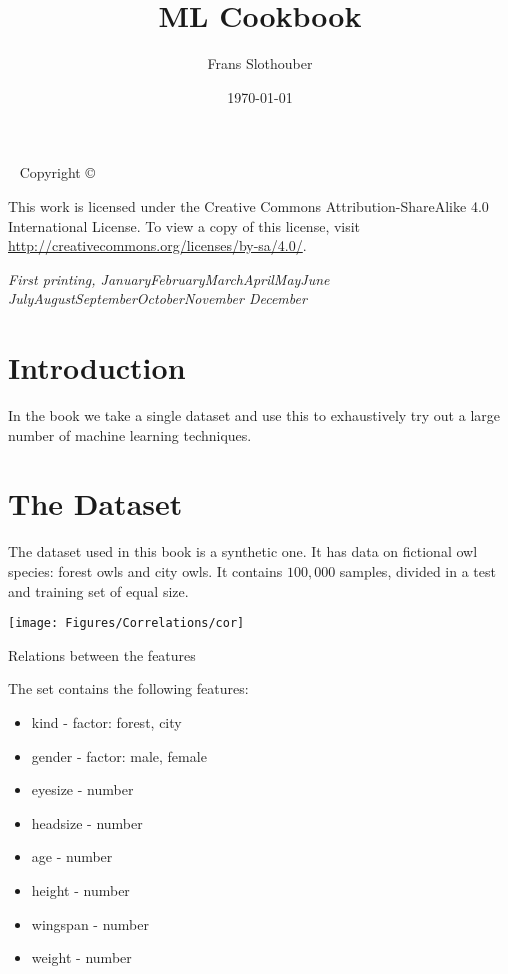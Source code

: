 \documentclass[11pt,a4paper,oldtoc,final]{tufte-book}
\title{ML Cookbook}
\author{Frans Slothouber}
\date{\today}
\newcommand{\blankpage}{\newpage\hbox{}\thispagestyle{empty}\newpage}
\newcommand{\monthyear}{%
  \ifcase\month\or January\or February\or March\or April\or May\or June\or
  July\or August\or September\or October\or November\or
  December\fi\space\number\year
}
\begin{document}
\frontmatter
\blankpage

\maketitle

\newpage
\begin{fullwidth}
~\vfill
\thispagestyle{empty}
\setlength{\parindent}{0pt}
\setlength{\parskip}{\baselineskip}
Copyright \copyright\ \the\year\ \thanklessauthor

\par{}


\par This work is licensed under the Creative Commons Attribution-ShareAlike
4.0 International License. To view a copy of this license, visit
\url{http://creativecommons.org/licenses/by-sa/4.0/}. 

\par\textit{First printing, \monthyear}
\end{fullwidth}



\chapter*{Introduction}

In the book we take a single dataset and use this to 
exhaustively try out a large number of machine learning techniques.

\mainmatter

\chapter{The Dataset}

The dataset used in this book is a synthetic one.
It has data on fictional owl species: forest owls and city owls.
 
It contains $100,000$ samples, divided in a test and training set of
equal size.

\begin{marginfigure}
    \texttt{[image: Figures/Correlations/cor]}
    \caption{Relations between the features}
\end{marginfigure}

The set contains the following features:
\begin{itemize}
    \item kind     - factor: forest, city
    \item gender   - factor: male, female
    \item eyesize  - number
    \item headsize - number
    \item age      - number
    \item height   - number
    \item wingspan - number
    \item weight   - number
\end{itemize}
\end{document}
